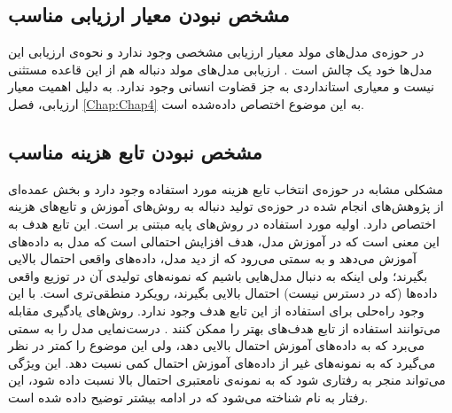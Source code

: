 \subsection{مشخص نبودن معیار ارزیابی مناسب}
در حوزه‌ی مدل‌های مولد معیار ارزیابی مشخصی وجود ندارد و نحوه‌ی ارزیابی این مدل‌ها خود یک چالش است
\cite{Lucas15NoteOnEvaluation}.
ارزیابی مدل‌های مولد دنباله هم از این قاعده مستثنی نیست و معیاری استانداردی به جز قضاوت انسانی وجود ندارد. به دلیل اهمیت معیار ارزیابی، فصل
\ref{Chap:Chap4}
به این موضوع اختصاص داده‌شده است.
\subsection{مشخص نبودن تابع هزینه مناسب}
مشکلی مشابه در حوزه‌ی انتخاب تابع هزینه مورد استفاده وجود دارد و بخش عمده‌ای از پژوهش‌های انجام شده در حوزه‌ی تولید دنباله به روش‌های آموزش و تابع‌های هزینه اختصاص دارد.
\newline
{}
اولیه مورد استفاده در روش‌های پایه مبتنی بر  
است. این تابع هدف به این معنی است که در آموزش مدل، هدف افزایش احتمالی است که مدل به داده‌های آموزش می‌دهد و به سمتی می‌رود که از دید مدل، داده‌های واقعی احتمال بالایی بگیرند؛
ولی اینکه به دنبال مدل‌هایی باشیم که نمونه‌های تولیدی آن در توزیع واقعی داده‌ها (که در دسترس نیست) احتمال بالایی بگیرند، رویکرد منطقی‌تری است. با این وجود راه‌حلی برای استفاده از این تابع هدف وجود ندارد.
روش‌های یادگیری مقابله می‌توانند استفاده از تابع هدف‌های بهتر را ممکن کنند
\cite{Huszar15HowNot}.
درست‌نمایی مدل را به سمتی می‌برد که به داده‌های آموزش احتمال بالایی دهد، ولی این موضوع را کمتر در نظر می‌گیرد که به نمونه‌های غیر از داده‌های آموزش احتمال کمی نسبت دهد. این ویژگی می‌تواند منجر به رفتاری شود که به نمونه‌ی نامعتبری احتمال بالا نسبت داده شود، این رفتار به نام 
شناخته می‌شود که در
ادامه بیشتر توضیح داده شده است.
